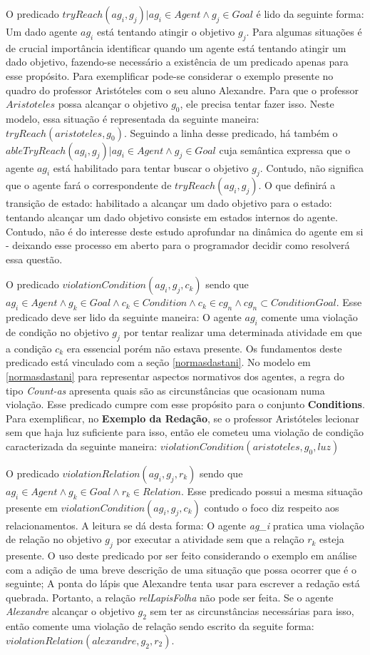 O predicado $tryReach(ag_i,g_j) | ag_i \in Agent \wedge g_j \in Goal $ é lido da seguinte forma: Um dado agente $ag_i$ está tentando 
atingir o objetivo $g_j$. Para algumas situações é de crucial importância identificar quando um agente está tentando atingir um 
dado objetivo, fazendo-se necessário a existência de um predicado apenas para esse propósito. Para exemplificar pode-se considerar 
o exemplo presente no quadro do professor Aristóteles com o seu aluno Alexandre. Para que o professor $Aristoteles$ possa alcançar 
o objetivo $g_0$, ele precisa tentar fazer isso. Neste modelo, essa situação é representada da seguinte maneira: $tryReach(aristoteles,g_0)$.
Seguindo a linha desse predicado, há também o $ableTryReach(ag_i,g_j) | ag_i \in Agent \wedge g_j \in Goal$ cuja semântica expressa que o agente $ag_i$ está habilitado para tentar buscar o objetivo $g_j$. Contudo, não significa que o agente fará o correspondente de $tryReach(ag_i,g_j)$. O que definirá a transição de estado: habilitado a alcançar um dado objetivo para o estado: tentando alcançar um dado objetivo consiste em estados internos do agente. Contudo, não é do interesse deste estudo aprofundar na dinâmica do agente em si - deixando esse processo em aberto para o programador decidir como resolverá essa questão.

O predicado $ violationCondition(ag_i,g_j,c_k) $ sendo que $ ag_i \in Agent \wedge g_k \in Goal \wedge c_k \in Condition \wedge c_k  \in cg_n \wedge cg_n \subset ConditionGoal $. Esse predicado deve ser lido da seguinte maneira: O agente $ag_i$ comente uma violação de condição no objetivo $g_j$ por tentar realizar uma determinada atividade em que a condição $c_k$ era essencial porém não estava presente. Os fundamentos deste predicado está vinculado com a seção \ref{normasdastani}. No modelo em \ref{normasdastani} para representar aspectos normativos dos agentes, a regra do tipo \textit{Count-as} apresenta quais são as circunstâncias que ocasionam numa violação. Esse predicado cumpre com esse propósito para o conjunto \textbf{Conditions}. Para exemplificar, no \textbf{Exemplo da Redação}, se o professor Aristóteles lecionar sem que haja luz suficiente para isso, então ele cometeu uma violação de condição caracterizada da seguinte maneira: $violationCondition(aristoteles,g_0,luz)$

O predicado $ violationRelation(ag_i,g_j,r_k) $ sendo que $ ag_i \in Agent \wedge g_k \in Goal \wedge r_k \in Relation $. Esse predicado possui a mesma situação presente em $ violationCondition(ag_i,g_j,c_k) $ contudo o foco diz respeito aos relacionamentos. A leitura se dá desta forma: O agente \textit{ag\_i} pratica uma violação de relação no objetivo $g_j$ por executar a atividade sem que a relação $r_k$ esteja presente. O uso deste predicado por ser feito considerando o exemplo em análise com a adição de uma breve descrição de uma situação que possa ocorrer que é o seguinte; A ponta do lápis que Alexandre tenta usar para escrever a redação está quebrada. Portanto, a relação \textit{relLapisFolha} não pode ser feita. Se o agente \textit{Alexandre} alcançar o objetivo $g_2$ sem ter as circunstâncias necessárias para isso, então comente uma violação de relação sendo escrito da seguite forma: $violationRelation(alexandre,g_2,r_2)$.

